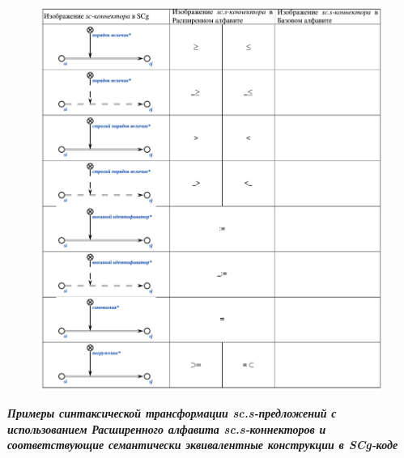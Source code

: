 \begin{figure}[h]
	\centering
	\includegraphics[scale=0.5]{images/intro/scs_non_membership_connectors_2.png}
\end{figure}

\newpage
\textbf{\textit{Примеры синтаксической трансформации sc.s-предложений с использованием Расширенного алфавита sc.s-коннекторов и соответствующие семантически эквивалентные конструкции в SCg-коде}}

\bigskip
\begin{SCn}
\begin{scnindent}
\end{scnindent}
\end{SCn}


